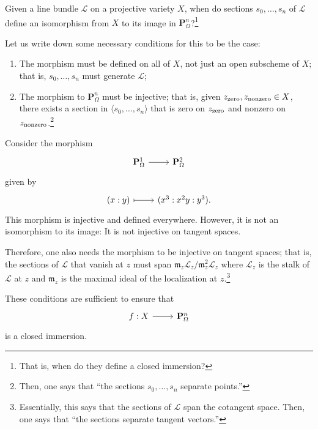 \documentclass [11 pt, oneside] {article}
\begin{document}
\begin{problem}
	Given a line bundle $\mathscr{L}$ on a projective variety $X$, when do sections $s_0,\hdots, s_n$ of $\mathscr{L}$ define an isomorphism from $X$ to its image in $\mathbf{P}^n_\Omega$?\footnote{That is, when do they define a closed immersion?}
\end{problem}
Let us write down some necessary conditions for this to be the case:
\begin{enumerate}
	\item The morphism must be defined on all of $X$, not just an open subscheme of $X$; that is, $s_0,\hdots,s_n$ must generate $\mathscr{L}$;
	\item The morphism to $\mathbf{P}^n_\Omega$ must be injective; that is, given $z_{\textup {zero}},z_{\textup {nonzero}}\in X$, there exists a section in $\langle s_0,\hdots, s_n\rangle$ that is zero on $z_{\textup {zero}}$ and nonzero on $z_{\textup {nonzero}}$.\footnote{Then, one says that ``the sections $s_0,\hdots, s_n$ separate points.''}
\end{enumerate}

\begin{example}\label{}\text{}
Consider the morphism
\[
\begin{tikzcd}
	\mathbf{P}^1_\Omega\ar[r]&\mathbf{P}^2_\Omega
\end{tikzcd}
\]
given by 
\[
\begin{tikzcd}
	(x:y) \ar[r,mapsto] & (x^3:x^2y:y^3).
\end{tikzcd}
\]
This morphism is injective and defined everywhere.
However, it is not an isomorphism to its image: It is not injective on tangent spaces.
\end{example}

Therefore, one also needs the morphism to be injective on tangent spaces; that is, the sections of $\mathscr{L}$ that vanish at $z$ must span $\mathfrak{m}_z\mathscr{L}_z/\mathfrak{m}_z^2\mathscr{L}_z$ where $\mathscr{L}_z$ is the stalk of $\mathscr{L}$ at $z$ and $\mathfrak{m}_z$ is the maximal ideal of the localization at $z$.\footnote{Essentially, this says that the sections of $\mathscr{L}$ span the cotangent space. Then, one says that ``the sections separate tangent vectors.''}

These conditions are sufficient to ensure that
\[
\begin{tikzcd}
	f:X\ar[r]&\mathbf{P}^n_\Omega
\end{tikzcd}
\]
is a closed immersion.
\end{document}
